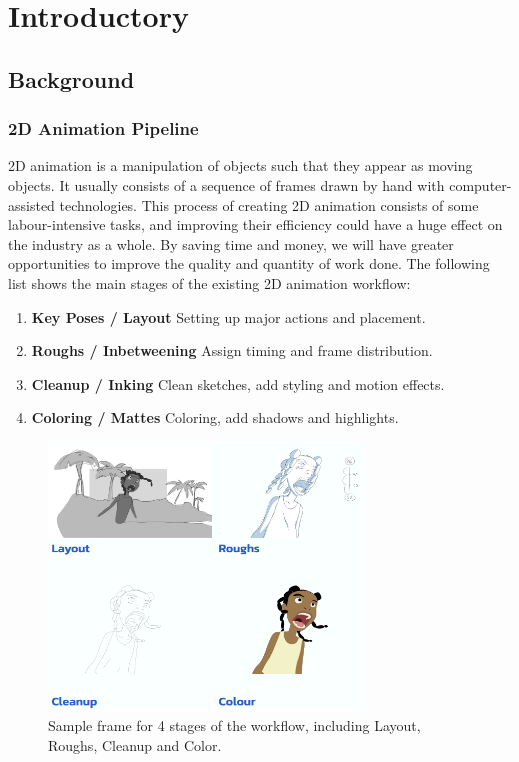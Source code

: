 \chapter{Introductory}
\label{chapterlabel1}
\section{Background}

\subsection{2D Animation Pipeline}
2D animation is a manipulation of objects such that they appear as moving objects. It usually consists of a sequence of frames drawn by hand with computer-assisted technologies. This process of creating 2D animation consists of some labour-intensive tasks, and improving their efficiency could have a huge effect on the industry as a whole. By saving time and money, we will have greater opportunities to improve the quality and quantity of work done. The following list shows the main stages of the existing 2D animation workflow:

\begin{enumerate}
    \item \textbf{Key Poses / Layout} Setting up major actions and placement.
    \item \textbf{Roughs / Inbetweening} Assign timing and frame distribution.
    \item \textbf{Cleanup / Inking} Clean sketches, add styling and motion effects.
    \item \textbf{Coloring / Mattes} Coloring, add shadows and highlights.
\end{enumerate}

\begin{figure}
    \centering
    \includegraphics[width=0.75\textwidth]{images/introduction/stages.png}
    \caption{Sample frame for 4 stages of the workflow, including Layout, Roughs, Cleanup and Color.} 
    \label{fig:stages}
\end{figure}


